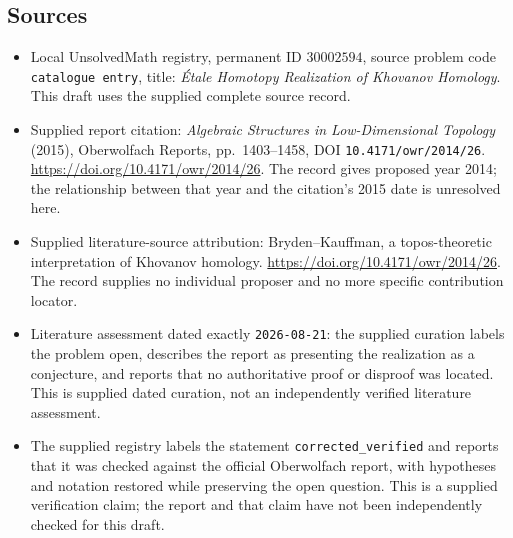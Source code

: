 \documentclass[11pt]{article}
\begin{document}
\subsection{Sources}
\begin{itemize}
\item Local UnsolvedMath registry, permanent ID \(30002594\), source problem code \texttt{catalogue entry}, title: \emph{\'{E}tale Homotopy Realization of Khovanov Homology}. This draft uses the supplied complete source record.
\item Supplied report citation: \emph{Algebraic Structures in Low-Dimensional Topology} (2015), Oberwolfach Reports, pp.\ 1403--1458, DOI \texttt{10.4171/owr/2014/26}. \url{https://doi.org/10.4171/owr/2014/26}. The record gives proposed year 2014; the relationship between that year and the citation's 2015 date is unresolved here.
\item Supplied literature-source attribution: Bryden--Kauffman, a topos-theoretic interpretation of Khovanov homology. \url{https://doi.org/10.4171/owr/2014/26}. The record supplies no individual proposer and no more specific contribution locator.
\item Literature assessment dated exactly \texttt{2026-08-21}: the supplied curation labels the problem open, describes the report as presenting the realization as a conjecture, and reports that no authoritative proof or disproof was located. This is supplied dated curation, not an independently verified literature assessment.
\item The supplied registry labels the statement \texttt{corrected\_verified} and reports that it was checked against the official Oberwolfach report, with hypotheses and notation restored while preserving the open question. This is a supplied verification claim; the report and that claim have not been independently checked for this draft.
\end{itemize}
\end{document}
